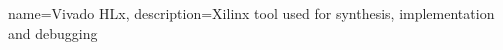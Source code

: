 %
%
{
    name=Vivado HLx,
    description={Xilinx tool used for synthesis, implementation and debugging}
}